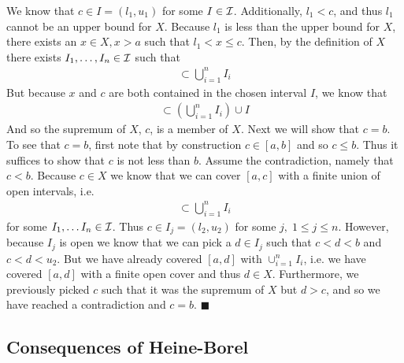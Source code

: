     We know that $c \in I = (l_1,u_1)$ for some $I \in \cal I$. Additionally, $l_1 < c$, and thus
    $l_1$ cannot be an upper bound for $X$. Because $l_1$ is less than the upper bound for $X$,
    there exists an $x \in X, x > a$ such that $l_1 < x \leq c$. Then, by the definition of $X$
    there exists $I_1,\ldots,I_n \in \cal I$ such that 
    \begin{align*}
      [a,x] \subset \bigcup_{i=1}^n I_i 
    \end{align*}
    But because $x$ and $c$ are both contained in the chosen interval $I$, we know that 
    \begin{align*}
      [a,c] \subset \left(\bigcup_{i=1}^n I_i \right)\cup I
    \end{align*}
    And so the supremum of $X$, $c$, is a member of $X$. Next we will show that $c = b$.\\

    To see that $c = b$, first note that by construction $c \in [a,b]$ and so $c \leq b$. Thus 
    it suffices to show that $c$ is not less than $b$. Assume the contradiction, namely that
    $c < b$. Because $c \in X$ we know that we can cover $[a,c]$ with a finite union of open 
    intervals, i.e.
    \begin{align*}
      [a,c] \subset \bigcup_{i=1}^n I_i
    \end{align*}
    for some $I_1, \ldots I_n \in \cal I$. Thus $c \in I_j =(l_2,u_2)$ for some $j, \;
    1 \leq j \leq n$. However, because $I_j$ is open we know that we can pick a $d \in I_j$ such 
    that $c < d < b$ and $c < d < u_2$. But we have already covered $[a,d]$ with $\cup_{i=1}^n
    I_i$, i.e. we have covered $[a,d]$ with a finite open cover and thus $d \in X$. Furthermore,
    we previously picked $c$ such that it was the supremum of $X$ but $d > c$, and so we have 
    reached a contradiction and $c = b$. $\blacksquare$
  \subsection{Consequences of Heine-Borel}
